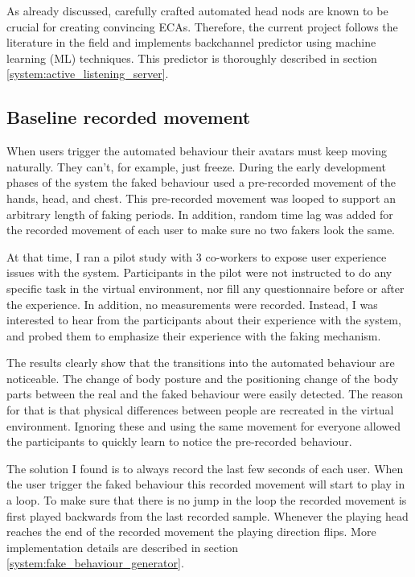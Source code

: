 \documentclass[]{simple-thesis}
\begin{document}
As already discussed, carefully crafted automated head nods are known to be crucial for creating convincing ECAs.
Therefore, the current project follows the literature in the field and implements backchannel predictor using machine learning (ML) techniques.
This predictor is thoroughly described in section \ref{system:active_listening_server}.

\subsection{Baseline recorded movement}

When users trigger the automated behaviour their avatars must keep moving naturally.
They can't, for example, just freeze.
During the early development phases of the system the faked behaviour used a pre-recorded movement of the hands, head, and chest.
This pre-recorded movement was looped to support an arbitrary length of faking periods.
In addition, random time lag was added for the recorded movement of each user to make sure no two fakers look the same.

At that time, I ran a pilot study with 3 co-workers to expose user experience issues with the system.
Participants in the pilot were not instructed to do any specific task in the virtual environment, nor fill any questionnaire before or after the experience.
In addition, no measurements were recorded.
Instead, I was interested to hear from the participants about their experience with the system, and probed them to emphasize their experience with the faking mechanism.

The results clearly show that the transitions into the automated behaviour are noticeable.
The change of body posture and the positioning change of the body parts between the real and the faked behaviour were easily detected.
The reason for that is that physical differences between people are recreated in the virtual environment.
Ignoring these and using the same movement for everyone allowed the participants to quickly learn to notice the pre-recorded behaviour.

The solution I found is to always record the last few seconds of each user.
When the user trigger the faked behaviour this recorded movement will start to play in a loop.
To make sure that there is no jump in the loop the recorded movement is first played backwards from the last recorded sample.
Whenever the playing head reaches the end of the recorded movement the playing direction flips.
More implementation details are described in section \ref{system:fake_behaviour_generator}.
\end{document}

